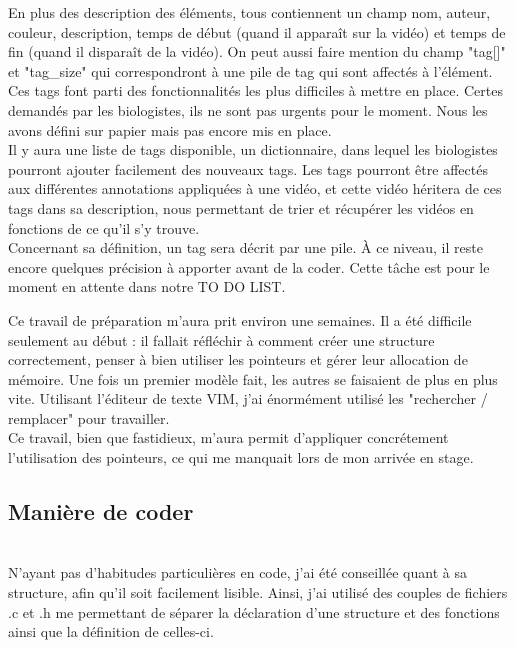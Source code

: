 \documentclass[11pt,french,a4paper]{report}
\begin{document}
En plus des description des éléments, tous contiennent un champ nom, auteur, couleur, description, temps de début 
(quand il apparaît sur la vidéo) et temps de fin (quand il disparaît de la vidéo). 
On peut aussi faire mention du champ "tag[]" et "tag\_size" qui correspondront à une pile de tag qui sont affectés à l'élément. \\

Ces tags font parti des fonctionnalités les plus difficiles à mettre en place. Certes demandés par les biologistes, ils ne sont 
pas urgents pour le moment. Nous les avons défini sur papier mais pas encore mis en place. \\

Il y aura une liste de tags disponible, un dictionnaire, dans lequel les biologistes pourront 
ajouter facilement des nouveaux tags. Les tags pourront être affectés aux différentes annotations appliquées
à une vidéo, et cette vidéo héritera de ces tags dans sa description, nous permettant de trier et récupérer les vidéos 
en fonctions de ce qu'il s'y trouve. \\
Concernant sa définition, un tag sera décrit par une pile. À ce niveau, il reste encore quelques précision à apporter
avant de la coder. Cette tâche est pour le moment en attente dans notre TO DO LIST. 


Ce travail de préparation m'aura prit environ une semaines. Il a été difficile seulement au début : il fallait réfléchir 
à comment créer une structure correctement, penser à bien utiliser les pointeurs et gérer leur allocation de
mémoire. Une fois un premier modèle fait, les autres se faisaient de plus en plus vite. Utilisant l'éditeur de texte VIM, j'ai 
énormément utilisé les "rechercher / remplacer" pour travailler. \\
Ce travail, bien que fastidieux, m'aura permit d'appliquer concrétement l'utilisation des pointeurs, ce qui 
me manquait lors de mon arrivée en stage. \\ 

        \subsection{Manière de coder}\\
N'ayant pas d'habitudes particulières en code, j'ai été conseillée quant à sa structure, afin qu'il 
soit facilement lisible. Ainsi, j'ai utilisé des couples de fichiers .c et .h me permettant de séparer 
la déclaration d'une structure et des fonctions ainsi que la définition de celles-ci. \\ 
\end{document}
